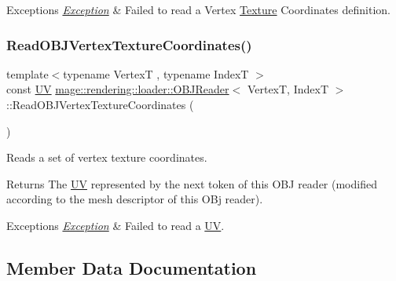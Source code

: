 \begin{DoxyExceptions}{Exceptions}
{\em \hyperlink{classmage_1_1_exception}{Exception}} & Failed to read a Vertex \hyperlink{classmage_1_1rendering_1_1_texture}{Texture} Coordinates definition. \\
\hline
\end{DoxyExceptions}
\hypertarget{classmage_1_1rendering_1_1loader_1_1_o_b_j_reader_a3fdbcdecf40525631afc53ce6a6dba45}{}\label{classmage_1_1rendering_1_1loader_1_1_o_b_j_reader_a3fdbcdecf40525631afc53ce6a6dba45} 
\subsubsection{\texorpdfstring{Read\+O\+B\+J\+Vertex\+Texture\+Coordinates()}{ReadOBJVertexTextureCoordinates()}}
{\footnotesize\ttfamily template$<$typename VertexT , typename IndexT $>$ \\
const \hyperlink{structmage_1_1_u_v}{UV} \hyperlink{classmage_1_1rendering_1_1loader_1_1_o_b_j_reader}{mage\+::rendering\+::loader\+::\+O\+B\+J\+Reader}$<$ VertexT, IndexT $>$\+::Read\+O\+B\+J\+Vertex\+Texture\+Coordinates (\begin{DoxyParamCaption}{ }\end{DoxyParamCaption})\hspace{0.3cm}{\ttfamily [private]}}

Reads a set of vertex texture coordinates.

\begin{DoxyReturn}{Returns}
The {\ttfamily \hyperlink{structmage_1_1_u_v}{UV}} represented by the next token of this O\+BJ reader (modified according to the mesh descriptor of this O\+Bj reader). 
\end{DoxyReturn}

\begin{DoxyExceptions}{Exceptions}
{\em \hyperlink{classmage_1_1_exception}{Exception}} & Failed to read a {\ttfamily \hyperlink{structmage_1_1_u_v}{UV}}. \\
\hline
\end{DoxyExceptions}


\subsection{Member Data Documentation}
\hypertarget{classmage_1_1rendering_1_1loader_1_1_o_b_j_reader_a4bad8aafabddb5cec68be8357d2d7566}{}\label{classmage_1_1rendering_1_1loader_1_1_o_b_j_reader_a4bad8aafabddb5cec68be8357d2d7566} 
